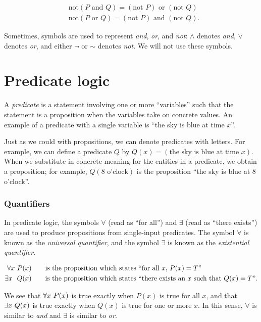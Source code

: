\begin{align*}
    &\text{not}(P \text{ and } Q) = (\text{not } P) \text{ or } (\text{not } Q) \\
    &\text{not}(P \text{ or } Q) = (\text{not } P) \text{ and } (\text{not } Q).
\end{align*}

Sometimes, symbols are used to represent \textit{and}, \textit{or}, and \textit{not}: $\wedge$ denotes \textit{and}, $\vee$ denotes \textit{or}, and either $\neg$ or $\sim$ denotes \textit{not}. We will not use these symbols.

\newpage

\section{Predicate logic}

A \textit{predicate} is a statement involving one or more ``variables'' such that the statement is a proposition when the variables take on concrete values. An example of a predicate with a single variable is ``the sky is blue at time $x$''.

Just as we could with propositions, we can denote predicates with letters. For example, we can define a predicate $Q$ by $Q(x) = (\text{the sky is blue at time $x$})$. When we substitute in concrete meaning for the entities in a predicate, we obtain a proposition; for example, $Q(\text{8 o'clock})$ is the proposition ``the sky is blue at 8 o'clock''.

\subsubsection*{Quantifiers}

In predicate logic, the symbols $\forall$ (read as ``for all'') and $\exists$ (read as ``there exists'') are used to produce propositions from single-input predicates. The symbol $\forall$ is known as the \textit{universal quantifier}, and the symbol $\exists$ is known as the \textit{existential quantifier}.

\begin{align*}
    \forall x \text{ } P(x) &\qquad \text{is the proposition which states ``for all $x$, $P(x) = T$''} \\
    \exists x \text{ } \text{ } Q(x) &\qquad \text{is the proposition which states ``there exists an $x$ such that $Q(x) = T$''}.
\end{align*}

We see that $\forall x \text{ } P(x)$ is true exactly when $P(x)$ is true for all $x$, and that $\exists x \text{ } Q(x)$ is true exactly when $Q(x)$ is true for one or more $x$. In this sense, $\forall$ is similar to \textit{and} and $\exists$ is similar to \textit{or}.

